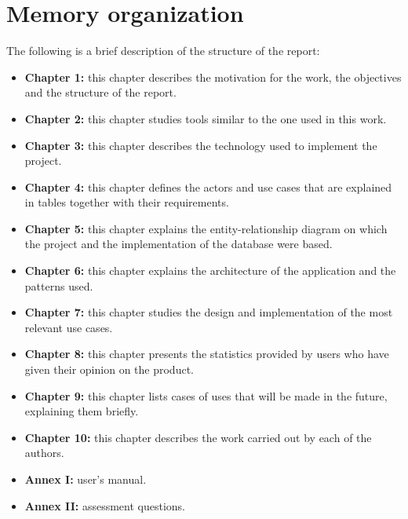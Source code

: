 \section{Memory organization}
The following is a brief description of the structure of the report:


\begin{itemize}
    \item \textbf{Chapter 1:} this chapter describes the motivation for the work, the objectives and the structure of the report.
    \item \textbf{Chapter 2:} this chapter studies tools similar to the one used in this work.
    \item \textbf{Chapter 3:} this chapter describes the technology used to implement the project.
    \item \textbf{Chapter 4:} this chapter defines the actors and use cases that are explained in tables together with their requirements.
    \item \textbf{Chapter 5:} this chapter explains the entity-relationship diagram on which the project and the implementation of the database were based.
    \item \textbf{Chapter 6:} this chapter explains the architecture of the application and the patterns used.
    \item \textbf{Chapter 7:} this chapter studies the design and implementation of the most relevant use cases.
    \item \textbf{Chapter 8:} this chapter presents the statistics provided by users who have given their opinion on the product.
    \item \textbf{Chapter 9:} this chapter lists cases of uses that will be made in the future, explaining them briefly.
    \item \textbf{Chapter 10:} this chapter describes the work carried out by each of the authors.
    \item \textbf{Annex I:} user's manual.
    \item \textbf{Annex II:} assessment questions.
\end{itemize}


